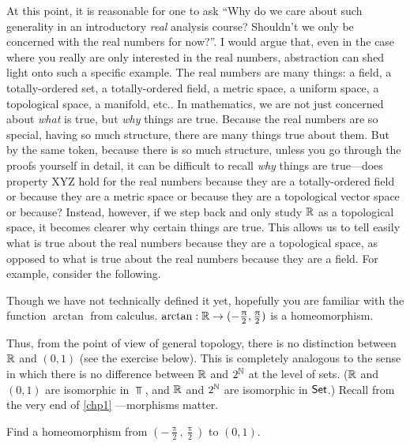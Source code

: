 At this point, it is reasonable for one to ask ``Why do we care about such generality in an introductory \emph{real} analysis course?  Shouldn't we only be concerned with the real numbers for now?''.  I would argue that, even in the case where you really are only interested in the real numbers, abstraction can shed light onto such a specific example.  The real numbers are many things:  a field, a totally-ordered set, a totally-ordered field, a metric space, a uniform space, a topological space, a manifold, etc..  In mathematics, we are not just concerned about \emph{what} is true, but \emph{why} things are true.  Because the real numbers are so special, having so much structure, there are many things true about them.  But by the same token, because there is so much structure, unless you go through the proofs yourself in detail, it can be difficult to recall \emph{why} things are true---does property XYZ hold for the real numbers because they are a totally-ordered field or because they are a metric space or because they are a topological vector space or because\textellipsis ?  Instead, however, if we step back and only study $\mathbb{R}$ as a topological space, it becomes clearer why certain things are true.  This allows us to tell easily what is true about the real numbers because they are a topological space, as opposed to what is true about the real numbers because they are a field.    For example, consider the following.
\begin{exm}
Though we have not technically defined it yet, hopefully you are familiar with the function $\arctan$ from calculus.  $\arctan :\mathbb{R} \rightarrow (-\frac{\uppi}{2},\frac{\uppi}{2})$ is a homeomorphism.
\end{exm}
Thus, from the point of view of general topology, there is no distinction between $\mathbb{R}$ and $(0,1)$ (see the exercise below).  This is completely analogous to the sense in which there is no difference between $\mathbb{R}$ and $2^{\mathbb{N}}$ at the level of sets.  ($\mathbb{R}$ and $(0,1)$ are isomorphic in $\Top$, and $\mathbb{R}$ and $2^{\mathbb{N}}$ are isomorphic in $\mathsf{Set}$.)  Recall from the very end of \cref{chp1} ---morphisms matter.
\begin{exr}
Find a homeomorphism from $(-\frac{\uppi}{2},\frac{\uppi}{2})$ to $(0,1)$.
\end{exr}

